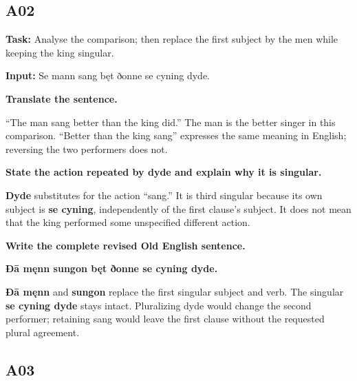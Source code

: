 \subsection*{A02}

\textbf{Task:} Analyse the comparison; then replace the first subject by the men while keeping the king singular.

\textbf{Input:} Se mann sang bęt ðonne se cyning dyde.

\textbf{Translate the sentence.}

“The man sang better than the king did.” The man is the better singer in this comparison. “Better than the king sang” expresses the same meaning in English; reversing the two performers does not.

\textbf{State the action repeated by dyde and explain why it is singular.}

\textbf{Dyde} substitutes for the action “sang.” It is third singular because its own subject is \textbf{se cyning}, independently of the first clause's subject. It does not mean that the king performed some unspecified different action.

\textbf{Write the complete revised Old English sentence.}

\textbf{Ðā męnn sungon bęt ðonne se cyning dyde.}

\textbf{Ðā męnn} and \textbf{sungon} replace the first singular subject and verb. The singular \textbf{se cyning dyde} stays intact. Pluralizing dyde would change the second performer; retaining sang would leave the first clause without the requested plural agreement.

\subsection*{A03}

